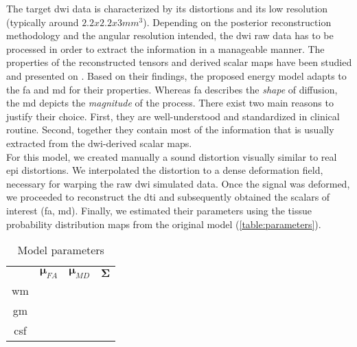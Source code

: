 The target \ac{dwi} data is characterized by its distortions and its
low resolution (typically around $2.2x2.2x3mm^3$). Depending on the
posterior reconstruction methodology and the angular resolution
intended, the \ac{dwi} raw data has to be processed in order to
extract the information in a manageable manner. The properties of
the reconstructed tensors and derived scalar maps have been
studied and presented on \cite{ennis_orthogonal_2006}. Based on their
findings, the proposed energy model adapts to the \ac{fa} and \ac{md}
for their properties.
Whereas \ac{fa} describes the \emph{shape} of diffusion, 
the \ac{md} depicts the \emph{magnitude} of the process. 
There exist two main reasons to justify their choice. 
First, they are well-understood and standardized in clinical routine.
Second, together they contain most of the information that is
usually extracted from the \ac{dwi}-derived scalar maps. \\

For this model, we created manually a sound distortion visually similar
to real \ac{epi} distortions. We interpolated the distortion to a 
dense deformation field, necessary for warping the raw \ac{dwi} simulated
data. Once the signal was deformed, we proceeded to reconstruct the
\ac{dti} and subsequently obtained the scalars of interest (\ac{fa}, \ac{md}).
Finally, we estimated their parameters using the tissue probability
distribution maps from the original model (\autoref{table:parameters}).

\begin{table}
\begin{tabular}{cccc}
         & $\mathbf{\mu}_{FA}$ & $\mathbf{\mu}_{MD}$ & $\mathbf{\Sigma}$ \\
\ac{wm}  & & & \\
\ac{gm}  & & & \\
\ac{csf} & & & \\
\end{tabular}
\caption{Model parameters}
\label{table:parameters}
\end{table}
